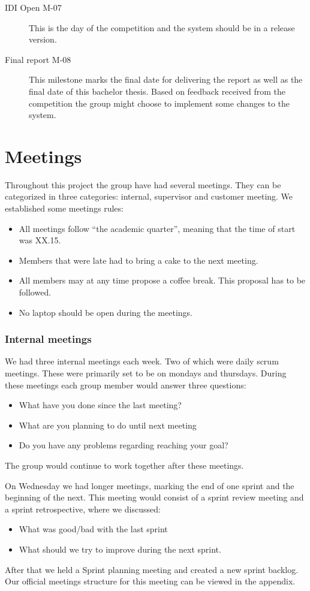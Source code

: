 \begin{description}
    \item[IDI Open M-07]
    This is the day of the competition and the system should be in a release
    version. 

    \item[Final report M-08]
    This milestone marks the final date for delivering the report as well as
    the final date of this bachelor thesis. Based on feedback received
    from the competition the group might choose to implement some changes
    to the system. 
\end{description}

\section{Meetings}
Throughout this project the group have had several meetings. They can be
categorized in three categories: internal, supervisor and customer
meeting. We established some meetings rules:
\begin{itemize}
    \item All meetings follow ``the academic quarter'', meaning that the time
        of start was XX.15.
    \item Members that were late had to bring a cake to the next meeting. 
    \item All members may at any time propose a coffee break. This proposal has
        to be followed. 
    \item No laptop should be open during the meetings. 
\end{itemize}
\subsubsection{Internal meetings}
We had three internal meetings each week. Two of which were daily scrum
meetings. These were primarily set to be on mondays and thursdays.
During these meetings each group member would answer three questions: 
\begin{itemize}
    \item What have you done since the last meeting?
    \item What are you planning to do until next meeting
    \item Do you have any problems regarding reaching your goal? 
\end{itemize}
The group would continue to work together after these meetings. 

On Wednesday we had longer meetings, marking the end of one sprint and
the beginning of the next. This meeting would consist of a sprint
review meeting and a sprint retrospective, where we discussed: 
\begin{itemize}
    \item What was good/bad with the last sprint
    \item What should we try to improve during the next sprint. 
\end{itemize}
After that we held a Sprint planning meeting and created a new sprint
backlog. Our official meetings structure for this meeting can be viewed
in the appendix. 

